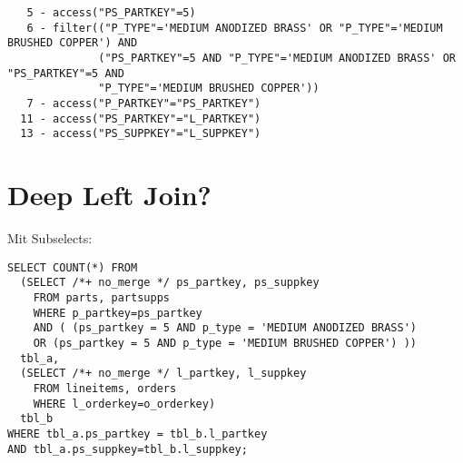 \documentclass[11pt,a4paper,parskip=half]{scrartcl}
\begin{document}
\begin{lstlisting}
   5 - access("PS_PARTKEY"=5)                                                                                                                                                                                                                                                                                
   6 - filter(("P_TYPE"='MEDIUM ANODIZED BRASS' OR "P_TYPE"='MEDIUM BRUSHED COPPER') AND                                                                                                                                                                                                                     
              ("PS_PARTKEY"=5 AND "P_TYPE"='MEDIUM ANODIZED BRASS' OR "PS_PARTKEY"=5 AND                                                                                                                                                                                                                     
              "P_TYPE"='MEDIUM BRUSHED COPPER'))                                                                                                                                                                                                                                                             
   7 - access("P_PARTKEY"="PS_PARTKEY")                                                                                                                                                                                                                                                                      
  11 - access("PS_PARTKEY"="L_PARTKEY")                                                                                                                                                                                                                                                                      
  13 - access("PS_SUPPKEY"="L_SUPPKEY")                                                                                                                                                                                                                                                                      
\end{lstlisting}

\section{Deep Left Join?}

Mit Subselects:
\begin{lstlisting}
SELECT COUNT(*) FROM
  (SELECT /*+ no_merge */ ps_partkey, ps_suppkey
    FROM parts, partsupps
    WHERE p_partkey=ps_partkey
    AND ( (ps_partkey = 5 AND p_type = 'MEDIUM ANODIZED BRASS')
    OR (ps_partkey = 5 AND p_type = 'MEDIUM BRUSHED COPPER') )) 
  tbl_a,
  (SELECT /*+ no_merge */ l_partkey, l_suppkey
    FROM lineitems, orders
    WHERE l_orderkey=o_orderkey) 
  tbl_b
WHERE tbl_a.ps_partkey = tbl_b.l_partkey
AND tbl_a.ps_suppkey=tbl_b.l_suppkey;
\end{lstlisting}
\end{document}
